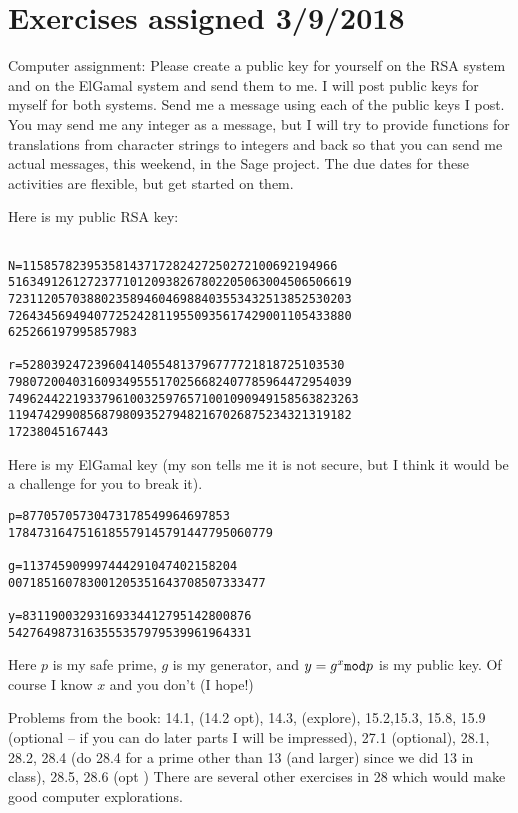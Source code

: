 \documentclass[12pt]{article}
\begin{document}
\section{Exercises assigned 3/9/2018}

Computer assignment:  Please create a public key for yourself on the RSA system and on the ElGamal system and send them to me.  I will post public keys for myself for both systems.  Send me a message using each of the public keys I post.  You may send me any integer as a message, but I will try to provide functions for translations from character strings to integers and back so that you can send me actual messages, this weekend, in the Sage project.  The due dates for these activities are flexible, but get started on them.

Here is my public RSA key:

\begin{verbatim}

N=11585782395358143717282427250272100692194966
516349126127237710120938267802205063004506506619
723112057038802358946046988403553432513852530203
726434569494077252428119550935617429001105433880
625266197995857983

r=528039247239604140554813796777721818725103530
798072004031609349555170256682407785964472954039
7496244221933796100325976571001090949158563823263
119474299085687980935279482167026875234321319182
17238045167443

\end{verbatim}

Here is my ElGamal key (my son tells me it is not secure, but I think it would be a challenge for you to break it).

\begin{verbatim}
p=87705705730473178549964697853
1784731647516185579145791447795060779

g=113745909997444291047402158204
007185160783001205351643708507333477

y=83119003293169334412795142800876
5427649873163555357979539961964331
\end{verbatim}

Here $p$ is my safe prime, $g$ is my generator, and $y = g^x {\tt mod} p$ is my public key.  Of course I know $x$ and you don't (I hope!)



Problems from the book:  14.1, (14.2 opt), 14.3, (explore), 15.2,15.3, 15.8, 15.9 (optional -- if you can do later parts I will be impressed), 27.1 (optional), 28.1, 28.2, 28.4 (do 28.4 for a prime other than 13 (and larger) since we did 13 in class),  28.5,  28.6 (opt )  There are several other exercises in 28 which would make good computer explorations.
\end{document}
